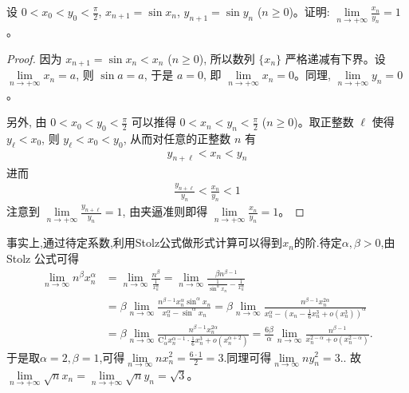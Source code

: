 \documentclass[../../main.tex]{subfiles}%
\begin{document}
\begin{example}
设 $0 < x_0 < y_0 < \frac{\pi}{2}$, $x_{n + 1} = \sin x_n$, $y_{n + 1} = \sin y_n$ ($n \geqslant  0$)。证明: $\lim\limits_{n \to +\infty} \frac{x_n}{y_n} = 1$。
\end{example}
\begin{proof}
因为 $x_{n + 1} = \sin x_n < x_n$ ($n \geqslant  0$), 所以数列 $\{x_n\}$ 严格递减有下界。设 $\lim\limits_{n \to +\infty} x_n = a$, 则 $\sin a = a$, 于是 $a = 0$, 即 $\lim\limits_{n \to +\infty} x_n = 0$。同理, $\lim\limits_{n \to +\infty} y_n = 0$。

另外, 由 $0 < x_0 < y_0 < \frac{\pi}{2}$ 可以推得 $0 < x_n < y_n < \frac{\pi}{2}$ ($n \geqslant  0$)。取正整数 $\ell$ 使得 $y_{\ell} < x_0$, 则 $y_{\ell} < x_0 < y_0$, 从而对任意的正整数 $n$ 有
\begin{align*}
y_{n + \ell} < x_n < y_n
\end{align*}
进而
\begin{align*}
\frac{y_{n + \ell}}{y_n} < \frac{x_n}{y_n} < 1
\end{align*}
注意到 $\lim\limits_{n \to +\infty} \frac{y_{n + \ell}}{y_n} = 1$, 由夹逼准则即得 $\lim\limits_{n \to +\infty} \frac{x_n}{y_n} = 1$。 
\end{proof}
\begin{remark}
事实上,通过待定系数,利用Stolz公式做形式计算可以得到$x_n$的阶.待定$\alpha,\beta>0$,由 Stolz 公式可得
\begin{align*}
\underset{n\rightarrow \infty}{\lim}n^{\beta}x_{n}^{\alpha}&=\underset{n\rightarrow \infty}{\lim}\frac{n^{\beta}}{\frac{1}{x_{n}^{\alpha}}}=\underset{n\rightarrow \infty}{\lim}\frac{\beta n^{\beta -1}}{\frac{1}{\sin ^{\alpha}x_n}-\frac{1}{x_{n}^{\alpha}}}
\\
&=\beta \underset{n\rightarrow \infty}{\lim}\frac{n^{\beta -1}x_{n}^{\alpha}\sin ^{\alpha}x_n}{x_{n}^{\alpha}-\sin ^{\alpha}x_n}=\beta \underset{n\rightarrow \infty}{\lim}\frac{n^{\beta -1}x_{n}^{2\alpha}}{x_{n}^{\alpha}-\left( x_n-\frac{1}{6}x_{n}^{3}+o\left( x_{n}^{3} \right) \right) ^{\alpha}}
\\
&=\beta \underset{n\rightarrow \infty}{\lim}\frac{n^{\beta -1}x_{n}^{2\alpha}}{\mathrm{C}_{\alpha}^{1}x_{n}^{\alpha -1}\cdot \frac{1}{6}x_{n}^{3}+o\left( x_{n}^{\alpha +2} \right)}=\frac{6\beta}{\alpha}\underset{n\rightarrow \infty}{\lim}\frac{n^{\beta -1}}{x_{n}^{2-\alpha}+o\left( x_{n}^{2-\alpha} \right)}.
\end{align*}
于是取$\alpha=2,\beta=1$,可得$\underset{n\rightarrow \infty}{\lim}nx_{n}^{2}=\frac{6\cdot 1}{2}=3.$同理可得$\underset{n\rightarrow \infty}{\lim}ny_{n}^{2}=3.$.
故 $\lim\limits_{n \to +\infty} \sqrt{n} x_n = \lim\limits_{n \to +\infty} \sqrt{n} y_n = \sqrt{3}$。 
\end{remark}
\end{document}
